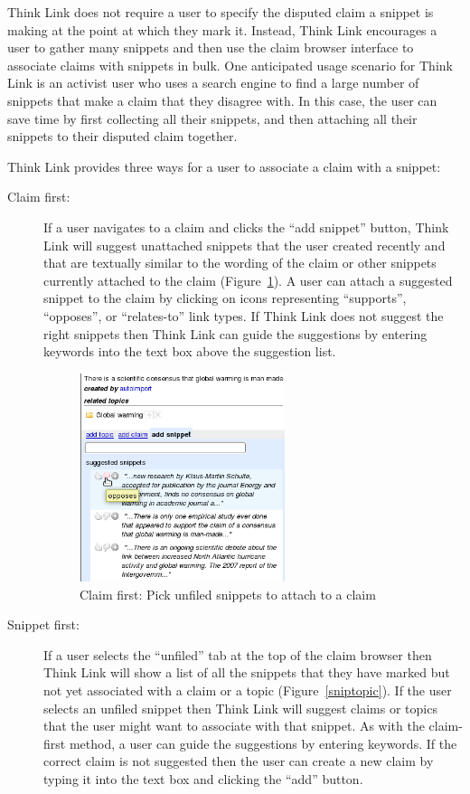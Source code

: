 \documentclass{chi2009}
\begin{document}
Think Link does not require a user to specify the disputed claim a snippet is making at the point at which they mark it. Instead, Think Link encourages a user to gather many snippets and then use the claim browser interface to associate claims with snippets in bulk.
One anticipated usage scenario for Think Link is an activist user who uses a search engine to find a large number of snippets that make a claim that they disagree with. 
In this case, the user can save time by first collecting all their snippets, and then attaching all their snippets to their disputed claim together.

Think Link provides three ways for a user to associate a claim with a snippet:

\begin{description}
\item[Claim first:] If a user navigates to a claim and clicks the ``add snippet'' button, Think Link will suggest unattached snippets that the user created recently and that are textually similar to the wording of the claim or other snippets currently attached to the claim (Figure~\ref{snipclaim}). A user can attach a suggested snippet to the claim by clicking on icons representing ``supports'', ``opposes'', or ``relates-to'' link types. If Think Link does not suggest the right snippets then Think Link can guide the suggestions by entering keywords into the text box above the suggestion list.

\begin{figure}[tb]
	\begin{center}
	\includegraphics[width=6cm]{../screenshots/v2_sugsnippet.png}
	\caption{Claim first: Pick unfiled snippets to attach to a claim}
	\label{snipclaim}
	\end{center}
\end{figure}

\item[Snippet first:] If a user selects the ``unfiled'' tab at the top of the claim browser then Think Link will show a list of all the snippets that they have marked but not yet associated with a claim or a topic (Figure~\ref{sniptopic}). If the user selects an unfiled snippet then Think Link will suggest claims or topics that the user might want to associate with that snippet. As with the claim-first method, a user can guide the suggestions by entering keywords. If the correct claim is not suggested then the user can create a new claim by typing it into the text box and clicking the ``add'' button.


\end{description}
\end{document}
